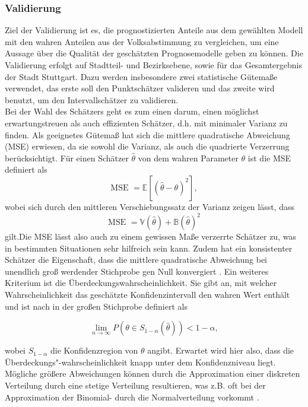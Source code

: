 \documentclass{Vorlage}
\begin{document}
\subsubsection{Validierung}
Ziel der Validierung ist es, die prognostizierten Anteile aus dem gewählten Modell mit den wahren Anteilen aus der 
Volksabstimmung \cite{Amt} zu vergleichen, um eine Aussage über die Qualität der geschätzten Prognosemodelle geben zu 
können. Die Validierung erfolgt auf Stadtteil- und Bezirksebene, sowie für das Gesamtergebnis der Stadt Stuttgart. Dazu 
werden insbesondere zwei statistische Gütemaße verwendet, das erste soll den Punktschätzer valideren und das zweite wird benutzt, um den Intervallschätzer zu validieren.\\
Bei der Wahl des Schätzers geht es zum einen darum, einen möglichst erwartungstreuen als auch effizienten Schätzer, d.h. mit minimaler Varianz zu finden. Als geeignetes Gütemaß hat sich die mittlere quadratische Abweichung (MSE) erwiesen, da sie sowohl die Varianz, als 
auch die quadrierte Verzerrung berücksichtigt. Für einen Schätzer $\hat{\theta}$ von dem wahren Parameter $\theta$ ist die MSE definiert als
$$
\text{MSE } = \mathbb{E}[(\hat{\theta} - \theta)^2],
$$
wobei sich durch den mittleren Verschiebungssatz der Varianz zeigen lässt, dass
$$
\text{MSE } = \mathbb{V}(\hat{\theta}) + \mathbb{B}(\hat{\theta})^2
$$
gilt.Die MSE lässt also auch zu einem gewissen Maße verzerrte Schätzer zu, was in bestimmten Situationen sehr hilfreich sein kann. Zudem hat ein konsistenter Schätzer die Eigenschaft, dass die mittlere 
quadratische Abweichung bei unendlich groß werdender Stichprobe gen Null konvergiert \cite[p. 201]{HOG}. Ein weiteres 
Kriterium ist die Überdeckungswahrscheinlichkeit. Sie gibt an, mit welcher Wahrscheinlichkeit das geschätzte 
Konfidenzintervall den wahren Wert enthält und ist nach \cite{zhang} in der großen Stichprobe definiert als

$$
\lim\limits_{n \rightarrow \infty}{P(\theta \in S_{1-\alpha}(\hat{\theta})) < 1-\alpha},
$$

wobei $S_{1-\alpha}$ die Konfidenzregion von $\theta$ angibt. Erwartet wird hier also, dass die Überdeckungs"-wahrscheinlichkeit knapp unter dem
Konfidenzniveau liegt. Mögliche größere Abweichungen können durch die Approximation einer diskreten Verteilung 
durch eine stetige Verteilung resultieren, was z.B. oft bei der Approximation der Binomial- durch die Normalverteilung 
vorkommt \cite[p. 102]{Int}.
\end{document}
